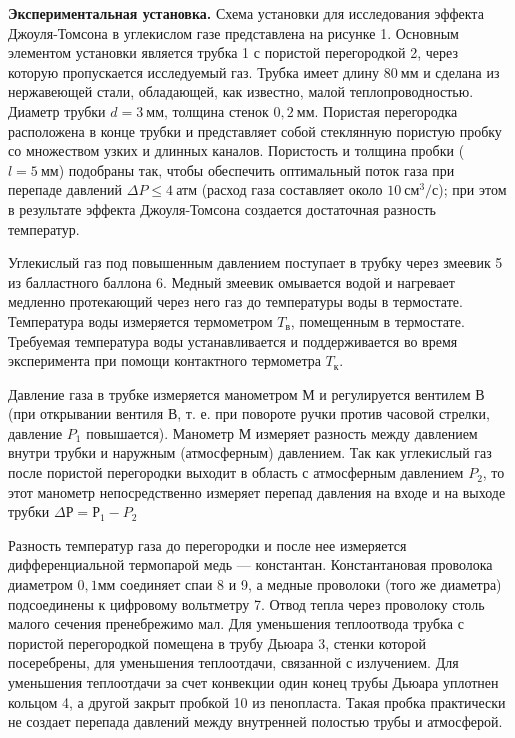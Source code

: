 \documentclass[a4paper,12pt]{article}
\theoremstyle{plain} %
\theoremstyle{definition} %
\theoremstyle{remark} %
\begin{document}
	\textbf{Экспериментальная установка.} Схема установки для исследования эффекта Джоуля-Томсона в углекислом газе представлена на рисунке 1. Основным элементом установки является трубка 1 с пористой перегородкой 2, через которую пропускается исследуемый газ. Трубка имеет длину $80\ \text{мм}$ и сделана из нержавеющей стали, обладающей, как известно, малой теплопроводностью. Диаметр трубки $d = 3\ \text{мм}$, толщина стенок $0,2\ \text{мм}$. Пористая перегородка расположена в конце трубки и представляет собой стеклянную пористую пробку со множеством узких и длинных каналов. Пористость и толщина пробки ($l = 5\ \text{мм}$) подобраны так, чтобы обеспечить оптимальный поток газа при перепаде давлений $
	\Delta P \leqslant 4\ \text{атм}$ (расход газа составляет около $10\  \text{см}^3/\text{с}$); при этом в результате эффекта Джоуля-Томсона создается достаточная разность температур. 
	
	Углекислый газ под повышенным давлением поступает в трубку через змеевик 5 из балластного баллона 6. Медный змеевик омывается водой и нагревает медленно протекающий через него газ до температуры воды в термостате. Температура воды измеряется термометром $T_\text{в}$, помещенным в термостате. Требуемая температура воды устанавливается и поддерживается во время эксперимента при помощи контактного термометра $T_\text{к}$.
	
	Давление газа в трубке измеряется манометром М и регулируется вентилем В (при открывании вентиля В, т. е. при повороте ручки против часовой стрелки, давление $P_1$ повышается). Манометр М измеряет разность между давлением внутри трубки и наружным (атмосферным) давлением. Так как углекислый газ после пористой перегородки выходит в область с атмосферным давлением $P_2$, то этот манометр непосредственно измеряет перепад давления на входе и на выходе трубки $\Delta Р = Р_1 - P_2$
	
	Разность температур газа до перегородки и после нее измеряется дифференциальной термопарой медь — константан. Константановая проволока диаметром $0,1 \text{мм}$ соединяет спаи 8 и 9, а медные проволоки (того же диаметра) подсоединены к цифровому вольтметру 7. Отвод тепла через проволоку столь малого сечения пренебрежимо мал. Для уменьшения теплоотвода трубка с пористой перегородкой помещена в трубу Дьюара 3, стенки которой посеребрены, для уменьшения теплоотдачи, связанной с излучением. Для уменьшения теплоотдачи за счет конвекции один конец трубы Дьюара уплотнен кольцом 4, а другой закрыт пробкой 10 из пенопласта. Такая пробка практически не создает перепада давлений между внутренней полостью трубы и атмосферой.
	\newpage
\end{document}

